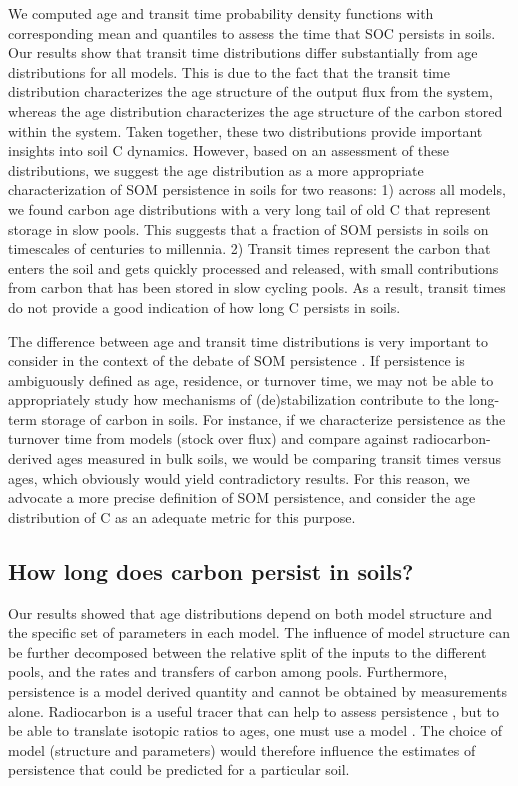 \documentclass[draft,linenumbers]{agujournal}
\begin{document}
We computed age and transit time probability density functions with corresponding mean and quantiles to assess the time that SOC persists in soils. Our results show that transit time distributions differ substantially from age distributions for all models. This is due to the fact that the transit time distribution characterizes the age structure of the output flux from the system, whereas the age distribution characterizes the age structure of the carbon stored within the system. Taken together, these two distributions provide important insights into soil C dynamics. However, based on an assessment of these distributions, we suggest the age distribution as a more appropriate characterization of SOM persistence in soils for two reasons:
1) across all models, we found carbon age distributions with a very long tail of old C that represent storage in slow pools. This suggests that a fraction of SOM persists in soils on timescales of centuries to millennia. 
2)	Transit times represent the carbon that enters the soil and gets quickly processed and released, with small contributions from carbon that has been stored in slow cycling pools. As a result, transit times do not provide a good indication of how long C persists in soils.

The difference between age and transit time distributions is very important to consider in the context of the debate of SOM persistence \citep{Schmidt2011, Dungait2012, LehmannKleber}. If persistence is ambiguously defined as age, residence, or turnover time, we may not be able to appropriately study how mechanisms of (de)stabilization contribute to the long-term storage of carbon in soils. For instance, if we characterize persistence as the turnover time from models (stock over flux) and compare against radiocarbon-derived ages measured in bulk soils, we would be comparing transit times versus ages, which obviously would yield contradictory results. For this reason, we advocate a more precise definition of SOM persistence, and consider the age distribution of C as an adequate metric for this purpose.

\subsection{How long does carbon persist in soils?}
Our results showed that age distributions depend on both model structure and the specific set of parameters in each model. The influence of model structure can be further decomposed between the relative split of the inputs to the different pools, and the rates and transfers of carbon among pools. Furthermore, persistence is a model derived quantity and cannot be obtained by measurements alone. Radiocarbon is a useful tracer that can help to assess persistence \citep{Trumbore2000, Trumbore2009}, but to be able to translate isotopic ratios to ages, one must use a model \citep{Trumbore2016}. The choice of model (structure and parameters) would therefore influence the estimates of persistence that could be predicted for a particular soil.
\end{document}
